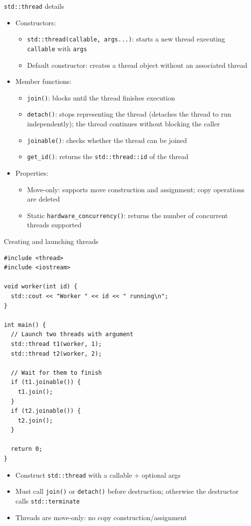 \documentclass{beamer}
\begin{document}
\begin{frame}{\texttt{std::thread} details}
  \begin{itemize}
    \item Constructors:
      \begin{itemize}
        \item \texttt{std::thread(callable, args...)}: starts a new thread executing \texttt{callable} with \texttt{args}
        \item Default constructor: creates a thread object without an associated thread
      \end{itemize}
    \item Member functions:
      \begin{itemize}
        \item \texttt{join()}: blocks until the thread finishes execution
        \item \texttt{detach()}: stops representing the thread (detaches the thread to run independently); the thread continues without blocking the caller
        \item \texttt{joinable()}: checks whether the thread can be joined
        \item \texttt{get\_id()}: returns the \texttt{std::thread::id} of the thread
      \end{itemize}
    \item Properties:
      \begin{itemize}
        \item Move-only: supports move construction and assignment; copy operations are deleted
        \item Static \texttt{hardware\_concurrency()}: returns the number of concurrent threads supported
      \end{itemize}
  \end{itemize}
\end{frame}

\begin{frame}[fragile]{Creating and launching threads}
  \lstset{style=CStyle}
  \begin{lstlisting}
#include <thread>
#include <iostream>

void worker(int id) {
  std::cout << "Worker " << id << " running\n";
}

int main() {
  // Launch two threads with argument
  std::thread t1(worker, 1);
  std::thread t2(worker, 2);

  // Wait for them to finish
  if (t1.joinable()) {
    t1.join();
  }
  if (t2.joinable()) {
    t2.join();
  }

  return 0;
}
  \end{lstlisting}
  \begin{itemize}
    \item Construct \texttt{std::thread} with a callable + optional args
    \item Must call \texttt{join()} or \texttt{detach()} before destruction; otherwise the destructor calls \texttt{std::terminate}
    \item Threads are move-only: no copy construction/assignment
  \end{itemize}
\end{frame}
\end{document}
